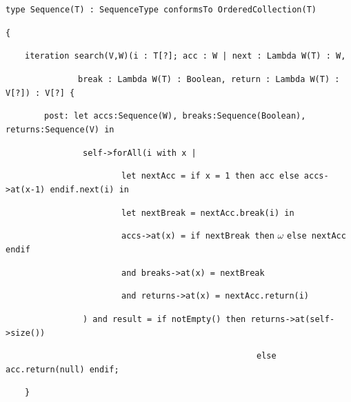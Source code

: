 \documentclass[
]{ceurart}
\begin{document}
\begin{description}[itemsep=-0.2cm]\vspace{-10pt}\small\begin{samepage}
\item \verb!type Sequence(T) : SequenceType conformsTo OrderedCollection(T)!
\item  \verb!{!
\item ~~~~\verb!iteration search(V,W)(i : T[?]; acc : W | next : Lambda W(T) : W, !
\item ~~~~~~~~~~~~~~~\verb!break : Lambda W(T) : Boolean, return : Lambda W(T) : V[?]) : V[?] {!
\item ~~~~~~~~\verb!post: let accs:Sequence(W), breaks:Sequence(Boolean), returns:Sequence(V) in!
\item ~~~~~~~~~~~~~~~~\verb!self->forAll(i with x |!
\item ~~~~~~~~~~~~~~~~~~~~~~~~\verb!let nextAcc = if x = 1 then acc else accs->at(x-1) endif.next(i) in!
\item ~~~~~~~~~~~~~~~~~~~~~~~~\verb!let nextBreak = nextAcc.break(i) in!
\item ~~~~~~~~~~~~~~~~~~~~~~~~\verb!accs->at(x) = if nextBreak then! $\omega$ \verb!else nextAcc endif! 
\item ~~~~~~~~~~~~~~~~~~~~~~~~\verb!and breaks->at(x) = nextBreak!
\item ~~~~~~~~~~~~~~~~~~~~~~~~\verb!and returns->at(x) = nextAcc.return(i)!
\item ~~~~~~~~~~~~~~~~\verb!) and result = if notEmpty() then returns->at(self->size())!
\item ~~~~~~~~~~~~~~~~~~~~~~~~~~~~~~~~~~~~~~~~~~~~~~~~~~~~\verb!else acc.return(null) endif;!
\item ~~~~\verb!}!
\end{samepage}\vspace{-10pt}\end{description}
\end{document}
